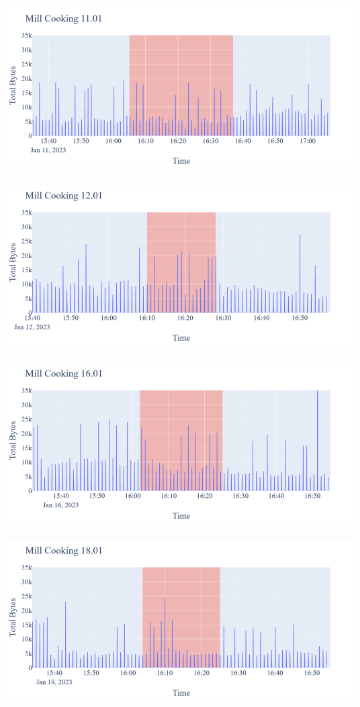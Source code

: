 \begin{figure}[H]
\begin{subfigure}[b]{0.5\textwidth}
        \centering
        \includegraphics[width=1.2\hsize]{figures/Mill_Cooking_Bytes_11.01.png}
    \end{subfigure}
    \begin{subfigure}[b]{0.5\textwidth}
        \centering
        \includegraphics[width=1.2\hsize]{figures/Mill_Cooking_Bytes_12.01.png}
    \end{subfigure}
    \begin{subfigure}[b]{0.5\textwidth}
        \centering
        \includegraphics[width=1.2\hsize]{figures/Mill_Cooking_Bytes_16.01.png}
    \end{subfigure}
    \begin{subfigure}[b]{0.5\textwidth}
        \centering
        \includegraphics[width=1.2\hsize]{figures/Mill_Cooking_Bytes_18.01.png}

\end{subfigure}
\end{figure}
